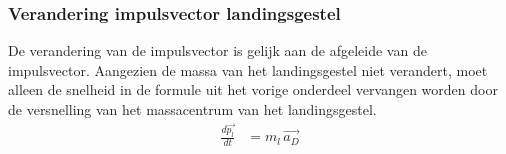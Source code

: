 \subsubsection{Verandering impulsvector landingsgestel}
De verandering van de impulsvector is gelijk aan de afgeleide van de impulsvector. Aangezien de massa van het landingsgestel niet verandert, moet alleen de snelheid in de formule uit het vorige onderdeel vervangen worden door de versnelling van het massacentrum van het landingsgestel.
\begin{equation}
\begin{split}
\frac{d\overrightarrow{{p}_{l}}}{dt}
&=m_{l}\,\overrightarrow{{a}_{D}}\\
\end{split}
\end{equation}

